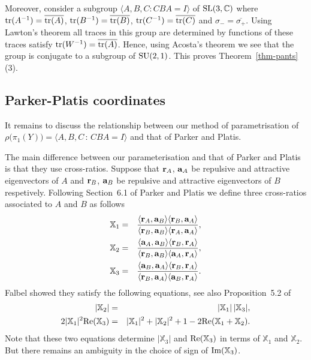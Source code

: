 \documentclass[11pt]{amsart}
\numberwithin{equation}{section}
\begin{document}
Moreover, consider a subgroup $\langle A,B,C:CBA=I\rangle$ of ${\rm SL}(3,{\mathbb C})$ where 
${\rm tr}(A^{-1})=\overline{{\rm tr}(A)}$, ${\rm tr}(B^{-1})=\overline{{\rm tr}(B)}$, ${\rm tr}(C^{-1})=\overline{{\rm tr}(C)}$
and $\sigma_-=\overline{\sigma_+}$. 
Using Lawton's theorem all traces in this group are determined by functions of these traces satisfy
${\rm tr}(W^{-1})=\overline{{\rm tr}(A)}$. Hence, using Acosta's theorem we see that the group is conjugate to a subgroup
of ${\rm SU}(2,1)$. This proves Theorem~\ref{thm-pants} (3).

\subsection{Parker-Platis coordinates}

It remains to discuss the relationship between our method of parametrisation of 
$\rho\bigl(\pi_1(Y)\bigr)=\langle A,B,C\,:\,CBA=I\rangle$ and that of Parker and Platis. 

The main difference between our parameterisation and that of Parker and Platis is that they use cross-ratios. 
Suppose that ${\bf r}_A$, ${\bf a}_A$ be repulsive and attractive eigenvectors of $A$ and 
${\bf r}_B$, ${\bf a}_B$ be repulsive and attractive eigenvectors of $B$ respetively. 
Following Section~6.1 of Parker and Platis \cite{PP} we define three cross-ratios associated to $A$ and $B$ as follows
\begin{eqnarray}
{\mathbb X}_1 & = & \frac{\langle{\bf r}_A,{\bf a}_B\rangle\langle{\bf r}_B,{\bf a}_A\rangle}
{\langle{\bf r}_B,{\bf a}_B\rangle\langle{\bf r}_A,{\bf a}_A\rangle}, \label{eq:X1} \\
{\mathbb X}_2 & = & \frac{\langle{\bf a}_A,{\bf a}_B\rangle\langle{\bf r}_B,{\bf r}_A\rangle}
{\langle{\bf r}_B,{\bf a}_B\rangle\langle{\bf a}_A,{\bf r}_A\rangle}, \label{eq:X2} \\
{\mathbb X}_3 & = & \frac{\langle{\bf a}_B,{\bf a}_A\rangle\langle{\bf r}_B,{\bf r}_A\rangle}
{\langle{\bf r}_B,{\bf a}_A\rangle\langle{\bf a}_B,{\bf r}_A\rangle}. \label{eq:X3}
\end{eqnarray}
Falbel \cite{Falbel} showed they satisfy the following equations, see also Proposition~5.2 of \cite{PP}
\begin{eqnarray*}
|{\mathbb X}_2| & = & |{\mathbb X}_1|\,|{\mathbb X}_3|, \\
2|{\mathbb X}_1|^2{\rm Re}({\mathbb X}_3) 
& = & |{\mathbb X}_1|^2+|{\mathbb X}_2|^2+1-2{\rm Re}({\mathbb X}_1+{\mathbb X}_2).
\end{eqnarray*}
Note that these two equations determine $|{\mathbb X}_3|$ and ${\rm Re}({\mathbb X}_3)$ in terms of
${\mathbb X}_1$ and ${\mathbb X}_2$. But there remains an ambiguity in the choice of sign of
${\rm Im}({\mathbb X}_3)$.
\end{document}

